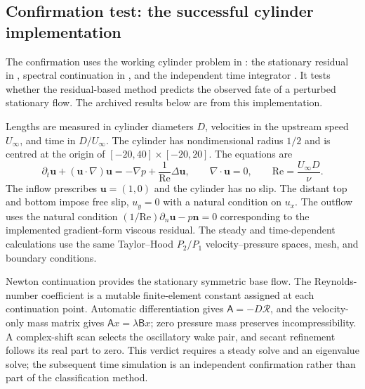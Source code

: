 \subsection{Confirmation test: the successful cylinder implementation}
\label{sec:cylinder-confirmation}
The confirmation uses the working cylinder problem in : the stationary residual in , spectral continuation in , and the independent time integrator . It tests whether the residual-based method predicts the observed fate of a perturbed stationary flow. The archived results below are from this implementation.

Lengths are measured in cylinder diameters $D$, velocities in the upstream speed $U_\infty$, and time in $D/U_\infty$. The cylinder has nondimensional radius $1/2$ and is centred at the origin of $[-20,40]\times[-20,20]$. The equations are
\begin{equation}
\partial_t\bm u+(\bm u\cdot\nabla)\bm u=-\nabla p+\frac{1}{\mathrm{Re}}\Delta\bm u,
\qquad \nabla\cdot\bm u=0,
\qquad \mathrm{Re}=\frac{U_\infty D}{\nu}.
\label{eq:cylinder-ns}
\end{equation}
The inflow prescribes $\bm u=(1,0)$ and the cylinder has no slip. The distant top and bottom impose free slip, $u_y=0$ with a natural condition on $u_x$. The outflow uses the natural condition $(1/\mathrm{Re})\partial_n\bm u-p\bm n=0$ corresponding to the implemented gradient-form viscous residual. The steady and time-dependent calculations use the same Taylor--Hood $P_2/P_1$ velocity--pressure spaces, mesh, and boundary conditions.

Newton continuation provides the stationary symmetric base flow. The Reynolds-number coefficient is a mutable finite-element constant assigned at each continuation point. Automatic differentiation gives $\mathsf A=-D\mathcal R$, and the velocity-only mass matrix gives $\mathsf A x=\lambda\mathsf Bx$; zero pressure mass preserves incompressibility. A complex-shift scan selects the oscillatory wake pair, and secant refinement follows its real part to zero. This verdict requires a steady solve and an eigenvalue solve; the subsequent time simulation is an independent confirmation rather than part of the classification method.

